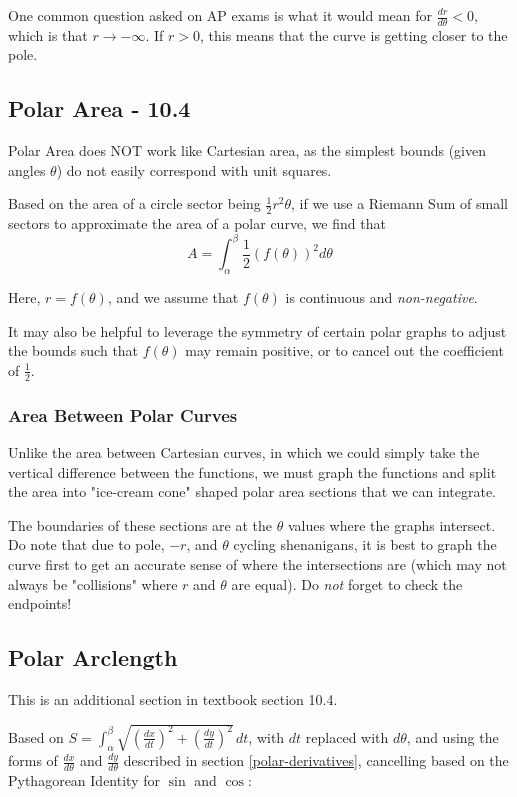 \documentclass{article}
\begin{document}
One common question asked on AP exams is what it would mean for $\frac{dr}{d\theta} < 0$, which is that $r \to -\infty$. If $r > 0$, this means that the curve is getting closer to the pole.

\subsection{Polar Area - 10.4}
Polar Area does NOT work like Cartesian area, as the simplest bounds (given angles $\theta$) do not easily correspond with unit squares.

Based on the area of a circle sector being $\frac{1}{2}r^2\theta$, if we use a Riemann Sum of small sectors to approximate the area of a polar curve, we find that
$$A = \int_{\alpha}^{\beta} \frac{1}{2} \left(f(\theta)\right)^2 d\theta$$

Here,  $r = f(\theta)$, and we assume that $f(\theta)$ is continuous and \emph{non-negative}.

It may also be helpful to leverage the symmetry of certain polar graphs to adjust the bounds such that $f(\theta)$ may remain positive, or to cancel out the coefficient of $\frac{1}{2}$.

\subsubsection{Area Between Polar Curves}
Unlike the area between Cartesian curves, in which we could simply take the vertical difference between the functions, we must graph the functions and split the area into "ice-cream cone" shaped polar area sections that we can integrate.

The boundaries of these sections are at the $\theta$ values where the graphs intersect. Do note that due to pole, $-r$, and $\theta$ cycling shenanigans, it is best to graph the curve first to get an accurate sense of where the intersections are (which may not always be "collisions" where $r$ and $\theta$ are equal). Do \emph{not} forget to check the endpoints!

\subsection{Polar Arclength}
This is an additional section in textbook section 10.4.

\vspace{.15in}
Based on $S = \int_{\alpha}^{\beta} \sqrt{\left(\frac{dx}{dt}\right)^2 + \left(\frac{dy}{dt}\right)^2} \,dt$, with $dt$ replaced with $d\theta$, and using the forms of $\frac{dx}{d\theta}$ and $\frac{dy}{d\theta}$ described in section \ref{polar-derivatives}, cancelling based on the Pythagorean Identity for $\sin$ and $\cos$:
\end{document}

